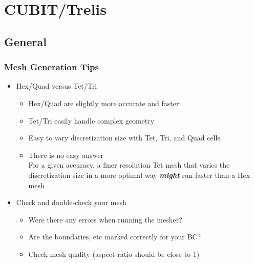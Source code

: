 \documentclass{beamer}
\begin{document}
\section{CUBIT/Trelis}
\subsection{General}

\begin{frame}
  \frametitle{Mesh Generation Tips}
 
  \begin{itemize}
  \item Hex/Quad versus Tet/Tri
    \begin{itemize}
    \item Hex/Quad are slightly more accurate and faster
    \item Tet/Tri easily handle complex geometry
    \item Easy to vary discretization size with Tet, Tri, and Quad cells
    \item There is no easy answer\\
      For a given accuracy, a finer resolution Tet mesh that varies
      the discretization size in a more optimal way {\bf\it might} run
      faster than a Hex mesh
    \end{itemize}
  \item Check and double-check your mesh
    \begin{itemize}
    \item Were there any errors when running the mesher?
    \item Are the boundaries, etc marked correctly for your BC?
    \item Check mesh quality (aspect ratio should be close to 1)
    \end{itemize}
  \end{itemize}

\end{frame}
\end{document}
